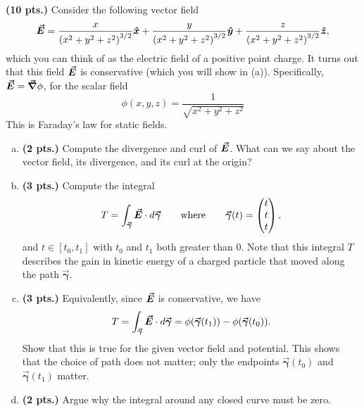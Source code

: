 \documentclass[12pt]{article} %
\newcommand{\curvegamma}{\boldsymbol{\vec{\gamma}}}
\begin{document}
\begin{problem}
\textbf{(10 pts.)} Consider the following vector field
    \[
    \boldsymbol{\vec{E}} = \frac{x}{\left(x^2+y^2+z^2\right)^{3/2}} \boldsymbol{\hat{x}} + \frac{y}{\left(x^2+y^2+z^2\right)^{3/2}} \boldsymbol{\hat{y}} + \frac{z}{\left(x^2+y^2+z^2\right)^{3/2}} \boldsymbol{\hat{z}},
    \]
    which you can think of as the electric field of a positive point charge.  It turns out that this field $\boldsymbol{\vec{E}}$ is conservative (which you will show in (a)). Specifically, $\boldsymbol{\vec{E}} = \boldsymbol{\vec{\nabla}} \phi$, for the scalar field
\[
\phi(x,y,z) = \frac{1}{\sqrt{x^2+y^2+z^2}}
\]
This is Faraday's law for static fields.
    \begin{enumerate}[(a)]
        \item \textbf{(2 pts.)} Compute the divergence and curl of $\boldsymbol{\vec{E}}$. What can we say about the vector field, its divergence, and its curl at the origin?
        \item \textbf{(3 pts.)} Compute the integral
        \[
        T=\int_{\curvegamma} \vecfieldE \cdot d\curvegamma \qquad \textrm{where} \qquad \curvegamma(t) = \begin{pmatrix} t \\ t \\ t \end{pmatrix},
        \]
        and $t\in [t_0,t_1]$ with $t_0$ and $t_1$ both greater than 0.  Note that this integral $T$ describes the gain in kinetic energy of a charged particle that moved along the path $\curvegamma$.
        \item \textbf{(3 pts.)} Equivalently, since $\boldsymbol{\vec{E}}$ is conservative, we have
        \[
        T=\int_{\curvegamma} \vecfieldE \cdot d\curvegamma = \phi(\curvegamma(t_1))-\phi(\curvegamma(t_0)).
        \]
        Show that this is true for the given vector field and potential. This shows that the choice of path does not matter; only the endpoints $\curvegamma(t_0)$ and $\curvegamma(t_1)$ matter.
        \item \textbf{(2 pts.)} Argue why the integral around any closed curve must be zero.
    \end{enumerate}
\end{problem}

%
\end{document}

